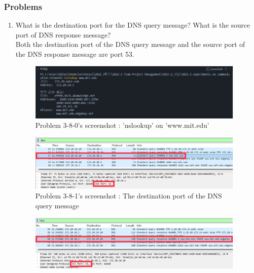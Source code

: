     \subsubsection*{Problems}
    \begin{enumerate}[label=\bfseries Problem \arabic*:,leftmargin=*,labelindent=1em]\addtocounter{enumi}{7}
        \item What is the destination port for the DNS query message? 
        What is the source port of DNS response message?\\[0.2mm]
            \soln Both the destination port of the DNS query message and the source port of the DNS response message are port 53.
            \vspace{-2mm}  
            \begin{figure}[!h]\centering
        		\includegraphics[width=.78\textwidth]{image/result_week01/Q3-8-0.png}
        		\caption{\footnotesize Problem 3-8-0's screenshot : 'nslookup' on 'www.mit.edu'}
        		\vspace{-10pt}
            \end{figure}
            \begin{figure}[!h]\centering
        		\includegraphics[width=.79\textwidth]{image/result_week01/Q3-8-1.png}
        		\caption{\footnotesize Problem 3-8-1's screenshot : The destination port of the DNS query message}
        		\vspace{-10pt}
            \end{figure}
            \begin{figure}[!h]\centering
        		\includegraphics[width=.79\textwidth]{image/result_week01/Q3-8-2.png}

\end{figure}
\end{enumerate}

